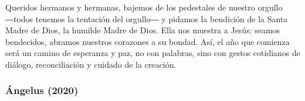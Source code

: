 Queridos hermanos y hermanas, bajemos de los pedestales de nuestro
orgullo ―todos tenemos la tentación del orgullo― y pidamos la bendición
de la Santa Madre de Dios, la humilde Madre de Dios. Ella nos muestra a
Jesús: seamos bendecidos, abramos nuestros corazones a su bondad. Así,
el año que comienza será un camino de esperanza y paz, no con palabras,
sino con gestos cotidianos de diálogo, reconciliación y cuidado de la
creación.

\subsubsection{Ángelus (2020)}